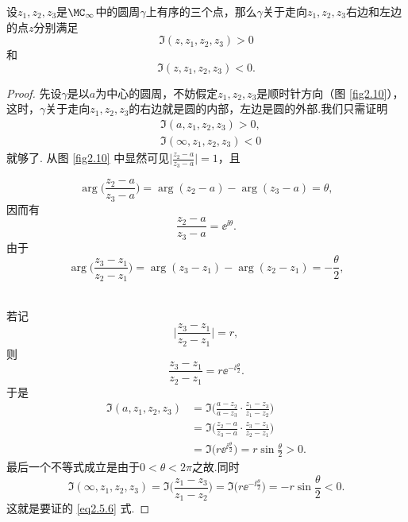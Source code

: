\begin{prop}\label{prop2.5.9}
设$z_1,z_2,z_3$是$\MC_\infty$中的圆周$\gamma$上有序的三个点，那么$\gamma$关于走向$z_1,z_2,z_3$右边和左边的点$z$分别满足
\[\Im(z,z_1,z_2,z_3)>0\]
和
\[\Im(z,z_1,z_2,z_3)<0.\]
\end{prop}
\begin{proof}
先设$\gamma$是以$a$为中心的圆周，不妨假定$z_1,z_2,z_3$是顺时针方向（图 \ref{fig2.10}），这时，$\gamma$关于走向$z_1,z_2,z_3$的右边就是圆的内部，左边是圆的外部.我们只需证明
\begin{equation}\label{eq2.5.6}
\begin{aligned}
  &\Im(a,z_1,z_2,z_3)>0,\\
  &\Im(\infty,z_1,z_2,z_3)<0
\end{aligned}
\end{equation}
就够了. 从图 \ref{fig2.10} 中显然可见$\bigg|\frac{z_2-a}{z_3-a}\bigg|=1$，且

\noindent\begin{minipage}[b]{0.75\textwidth}
\[\arg\bigg(\frac{z_2-a}{z_3-a}\bigg)=\arg(z_2-a)-\arg(z_3-a)=\theta,\]
因而有
\[\frac{z_2-a}{z_3-a}=\ee^{\ii\theta}.\]
由于
\[\arg\bigg(\frac{z_3-z_1}{z_2-z_1}\bigg)=\arg(z_3-z_1)-\arg(z_2-z_1)=-\frac\theta2,\]
\end{minipage}
\begin{minipage}[b]{0.25\textwidth}
\centering
{}
\end{minipage}\\
若记
\[\bigg|\frac{z_3-z_1}{z_2-z_1}\bigg|=r,\]
则
\[\frac{z_3-z_1}{z_2-z_1}=r\ee^{-\ii\frac\theta2}.\]
于是
\begin{align*}
\Im(a,z_1,z_2,z_3)&=\Im\bigg(\frac{a-z_2}{a-z_3}\cdot\frac{z_1-z_3}{z_1-z_2}\bigg)\\
&=\Im\bigg(\frac{z_2-a}{z_3-a}\cdot\frac{z_3-z_1}{z_2-z_1}\bigg)\\
&=\Im\big(r\ee^{\ii\frac\theta2}\big)=r\sin\frac\theta2>0.
\end{align*}
最后一个不等式成立是由于$0<\theta<2\pi$之故.同时
\[
\Im(\infty,z_1,z_2,z_3)=\Im\bigg(\frac{z_1-z_3}{z_1-z_2}\bigg)
=\Im\big(r\ee^{-\ii\frac\theta2}\big)
=-r\sin\frac\theta2<0.
\]
这就是要证的 \eqref{eq2.5.6} 式.


\end{proof}
